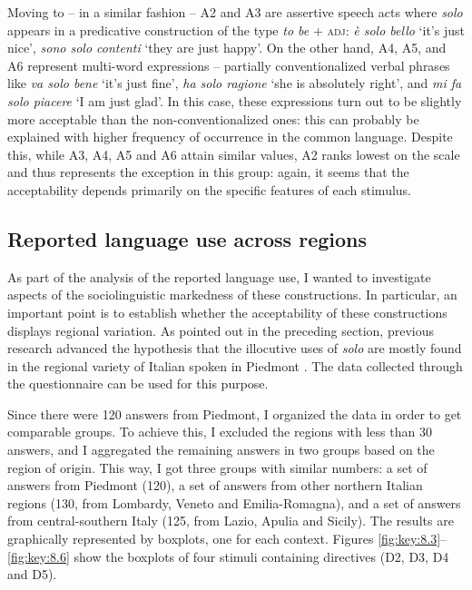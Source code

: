 Moving to  – in a similar fashion – A2 and A3 are assertive speech acts where \textit{solo} appears in a predicative construction of the type \textit{to be} + \textsc{adj}: \textit{è solo bello} ‘it’s just nice’, \textit{sono solo contenti} ‘they are just happy’. On the other hand, A4, A5, and A6 represent multi-word expressions – partially conventionalized verbal phrases like \textit{va solo bene} ‘it’s just fine’, \textit{ha solo ragione} ‘she is absolutely right’, and \textit{mi fa solo piacere} ‘I am just glad’. In this case, these expressions turn out to be slightly more acceptable than the non-conventionalized ones: this can probably be explained with higher frequency of occurrence in the common language. Despite this, while A3, A4, A5 and A6 attain similar values, A2 ranks lowest on the scale and thus represents the exception in this group: again, it seems that the acceptability depends primarily on the specific features of each stimulus.

\subsection{Reported language use across regions}
\hypertarget{Toc124860674}{}
As part of the analysis of the reported language use, I wanted to investigate aspects of the sociolinguistic markedness of these constructions. In particular, an important point is to establish whether the acceptability of these constructions displays regional variation. As pointed out in the preceding section, previous research advanced the hypothesis that the illocutive uses of \textit{solo} are mostly found in the regional variety of Italian spoken in Piedmont \citep{Favaro2019}. The data collected through the questionnaire can be used for this purpose. 

Since there were 120 answers from Piedmont, I organized the data in order to get comparable groups. To achieve this, I excluded the regions with less than 30 answers, and I aggregated the remaining answers in two groups based on the region of origin. This way, I got three groups with similar numbers: a set of answers from Piedmont (120), a set of answers from other northern Italian regions (130, from Lombardy, Veneto and Emilia-Romagna), and a set of answers from central-southern Italy (125, from Lazio, Apulia and Sicily). The results are graphically represented by boxplots, one for each context. Figures \ref{fig:key:8.3}–\ref{fig:key:8.6} show the boxplots of four stimuli containing directives (D2, D3, D4 and D5).

